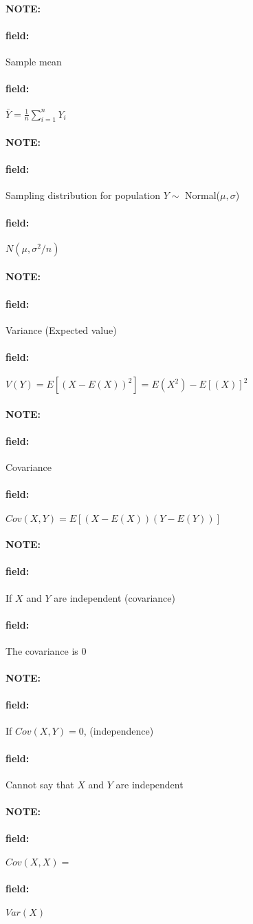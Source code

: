 \documentclass[12pt]{article}
\newenvironment{note}{\paragraph{NOTE:}}{}
\newenvironment{field}{\paragraph{field:}}{}
\begin{document}
\begin{note}
 \begin{field}
  Sample mean
 \end{field}
 \begin{field}
  $\bar{Y} = \frac{1}{n}\sum_{i=1}^n Y_i$
 \end{field}
\end{note}

\begin{note}
 \begin{field}
  Sampling distribution for population $Y \sim $ Normal($\mu,\sigma$)
 \end{field}
 \begin{field}
  $N(\mu,\sigma^2/n)$
 \end{field}
\end{note}

\begin{note}
 \begin{field}
  Variance (Expected value)
 \end{field}
 \begin{field}
  $V(Y) = E[(X - E(X))^2] = E(X^2) - E[(X)]^2$
 \end{field}
\end{note}

\begin{note}
 \begin{field}
  Covariance
 \end{field}
 \begin{field}
  $Cov(X,Y) = E[(X - E(X))(Y - E(Y))]$
 \end{field}
\end{note}

\begin{note}
 \begin{field}
  If $X$ and $Y$ are independent (covariance)
 \end{field}
 \begin{field}
  The covariance is 0
 \end{field}
\end{note}

\begin{note}
 \begin{field}
  If $Cov(X,Y) = 0$, (independence)
 \end{field}
 \begin{field}
  Cannot say that $X$ and $Y$ are independent
 \end{field}
\end{note}

\begin{note}
 \begin{field}
  $Cov(X,X) =$
 \end{field}
 \begin{field}
  $Var(X)$
 \end{field}
\end{note}
\end{document}
